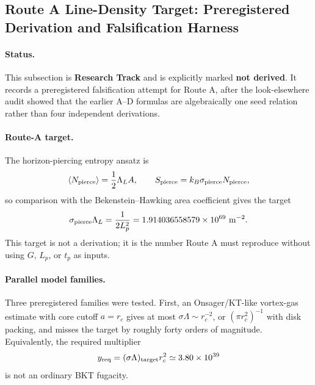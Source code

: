 
\subsection{Route A Line-Density Target: Preregistered Derivation and Falsification Harness}
\label{sec:routeA_preregistered_falsification}

\paragraph{Status.}
This subsection is \textbf{Research Track} and is explicitly marked
\textbf{not derived}.  It records a preregistered falsification attempt for
Route A, after the look-elsewhere audit showed that the earlier A--D formulas
are algebraically one seed relation rather than four independent derivations.

\paragraph{Route-A target.}
The horizon-piercing entropy ansatz is
\begin{equation}
  \langle N_{\rm pierce}\rangle = {1\over 2}\Lambda_L A,
  \qquad
  S_{\rm pierce}=k_B\sigma_{\rm pierce}N_{\rm pierce},
\end{equation}
so comparison with the Bekenstein--Hawking area coefficient gives the target
\begin{equation}
  \sigma_{\rm pierce}\Lambda_L
  = {1\over 2L_p^2}
  = 1.914036558579\times10^{69}\ {\rm m^{-2}}.
\end{equation}
This target is not a derivation; it is the number Route A must reproduce
without using $G$, $L_p$, or $t_p$ as inputs.

\paragraph{Parallel model families.}
Three preregistered families were tested.
First, an Onsager/KT-like vortex-gas estimate with core cutoff $a=r_c$ gives
at most $\sigma\Lambda\sim r_c^{-2}$, or $(\pi r_c^2)^{-1}$ with disk packing,
and misses the target by roughly forty orders of magnitude.  Equivalently, the
required multiplier
\begin{equation}
  y_{\rm req}=(\sigma\Lambda)_{\rm target}r_c^2
  \simeq 3.80\times10^{39}
\end{equation}
is not an ordinary BKT fugacity.


